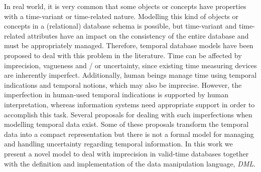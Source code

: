 %
%
In real world, it is very common that some objects or concepts have properties with a time-variant or time-related nature. Modelling this kind of objects or concepts in a (relational) database schema is possible, but time-variant and time-related attributes have an impact on the consistency of the entire database and must be appropriately managed. Therefore, temporal database models have been proposed to deal with this problem in the literature. Time can be affected by imprecision, vagueness and / or  uncertainty, since existing time measuring devices are inherently imperfect. Additionally, human beings manage time using temporal indications and temporal notions, which may also be imprecise. However, the imperfection in human-used temporal indications is supported by human interpretation, whereas information systems need appropriate support in order to accomplish this task. Several proposals for dealing with such imperfections when modelling temporal data exist. Some of these proposals transform the temporal data into a compact representation but there is not a formal model for managing and handling uncertainty regarding temporal information.
In this work we present a novel model to deal with imprecision in valid-time databases together with the definition and implementation of the data manipulation language, \emph{DML}.
